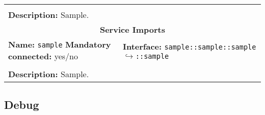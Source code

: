\begin{center}
\begin{tabular}{|p{7.5cm}|p{7.5cm}|}
		\multicolumn{2}{|l|}{}\\
		\multicolumn{2}{|p{15cm}|}{\textbf{Description:} \newline Sample.}\\
		\hline
		\hline
		\multicolumn{2}{|c|}{\textbf{\large Service Imports}}\\
		\hline
		\multicolumn{1}{|p{7.5cm}}{\textbf{Name:} \texttt{sample} \newline \textbf{Mandatory connected:} yes/no} & \multicolumn{1}{p{7.5cm}|}{\textbf{Interface:} \newline \texttt{sample::sample::sample} \newline$\hookrightarrow$\texttt{::sample}}\\
		\multicolumn{2}{|l|}{}\\
		\multicolumn{2}{|p{15cm}|}{\textbf{Description:} \newline Sample.}\\
		\hline
	\end{tabular}
\end{center}

\subsection{Debug}

